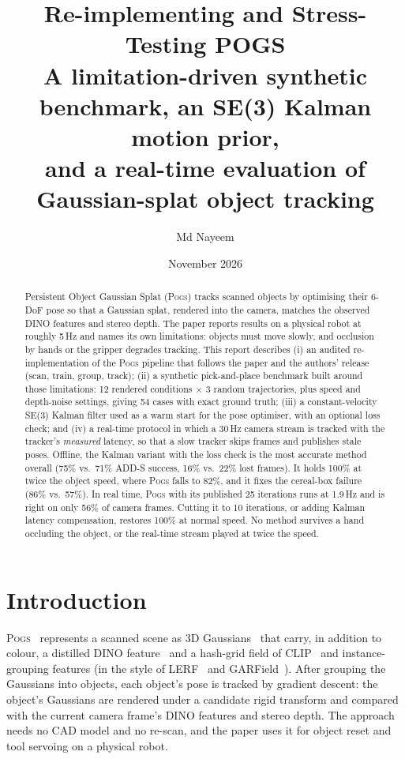 \documentclass[10pt,a4paper]{article}
\title{\textbf{Re-implementing and Stress-Testing POGS}\\[0.3em]
\large A limitation-driven synthetic benchmark, an SE(3) Kalman motion prior,\\
and a real-time evaluation of Gaussian-splat object tracking}
\author{Md Nayeem}
\date{November 2026}
\newcommand{\pogs}{\textsc{Pogs}}
\begin{document}
\maketitle

\begin{abstract}
Persistent Object Gaussian Splat (\pogs{}) tracks scanned objects by optimising
their 6-DoF pose so that a Gaussian splat, rendered into the camera, matches
the observed DINO features and stereo depth. The paper reports results on a
physical robot at roughly 5\,Hz and names its own limitations: objects must
move slowly, and occlusion by hands or the gripper degrades tracking. This
report describes (i) an audited re-implementation of the \pogs{} pipeline that
follows the paper and the authors' release (scan, train, group, track);
(ii) a synthetic pick-and-place benchmark built around those limitations:
12 rendered conditions $\times$ 3 random trajectories, plus speed and depth-noise
settings, giving 54 cases with exact ground truth; (iii) a constant-velocity
SE(3) Kalman filter used as a warm start for the pose optimiser, with an
optional loss check; and (iv) a real-time protocol in which a 30\,Hz camera
stream is tracked with the tracker's \emph{measured} latency, so that a slow
tracker skips frames and publishes stale poses. Offline, the Kalman variant
with the loss check is the most accurate method overall (75\% vs.\ 71\%
ADD-S success, 16\% vs.\ 22\% lost frames). It holds 100\% at twice the object
speed, where \pogs{} falls to 82\%, and it fixes the cereal-box failure
(86\% vs.\ 57\%). In real time, \pogs{} with its published 25 iterations runs at
1.9\,Hz and is right on only 56\% of camera frames. Cutting it to 10 iterations,
or adding Kalman latency compensation, restores 100\% at normal speed. No method
survives a hand occluding the object, or the real-time stream played at twice
the speed.
\end{abstract}

\tableofcontents
\newpage

\section{Introduction}

\pogs{}~\cite{pogs} represents a scanned scene as 3D Gaussians~\cite{kerbl3dgs}
that carry, in addition to colour, a distilled DINO feature~\cite{dinov2} and a
hash-grid field of CLIP~\cite{clip} and instance-grouping features (in the style
of LERF~\cite{lerf} and GARField~\cite{garfield}). After grouping the Gaussians
into objects, each object's pose is tracked by gradient descent: the object's
Gaussians are rendered under a candidate rigid transform and compared with the
current camera frame's DINO features and stereo depth. The approach needs no
CAD model and no re-scan, and the paper uses it for object reset and tool
servoing on a physical robot.
\end{document}
